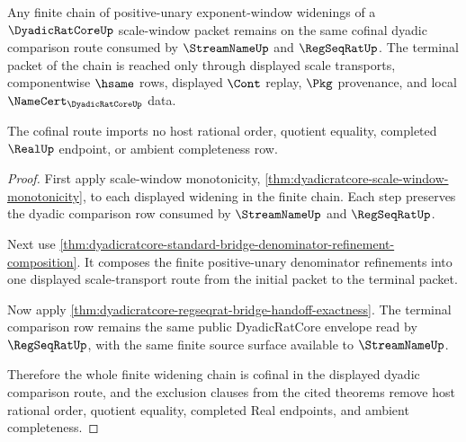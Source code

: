 \begin{theorem}
\label{thm:dyadicratcore-scale-window-cofinality}
Any finite chain of positive-unary exponent-window widenings of a $\DyadicRatCoreUp$ scale-window packet remains on the same cofinal dyadic comparison route consumed by $\StreamNameUp$ and $\RegSeqRatUp$. The terminal packet of the chain is reached only through displayed scale transports, componentwise $\hsame$ rows, displayed $\Cont$ replay, $\Pkg$ provenance, and local $\NameCert_{\DyadicRatCoreUp}$ data.

The cofinal route imports no host rational order, quotient equality, completed $\RealUp$ endpoint, or ambient completeness row.
\end{theorem}
\begin{proof}
First apply scale-window monotonicity, \autoref{thm:dyadicratcore-scale-window-monotonicity}, to each displayed widening in the finite chain. Each step preserves the dyadic comparison row consumed by $\StreamNameUp$ and $\RegSeqRatUp$.

Next use \autoref{thm:dyadicratcore-standard-bridge-denominator-refinement-composition}. It composes the finite positive-unary denominator refinements into one displayed scale-transport route from the initial packet to the terminal packet.

Now apply \autoref{thm:dyadicratcore-regseqrat-bridge-handoff-exactness}. The terminal comparison row remains the same public DyadicRatCore envelope read by $\RegSeqRatUp$, with the same finite source surface available to $\StreamNameUp$.

Therefore the whole finite widening chain is cofinal in the displayed dyadic comparison route, and the exclusion clauses from the cited theorems remove host rational order, quotient equality, completed Real endpoints, and ambient completeness.
\end{proof}

